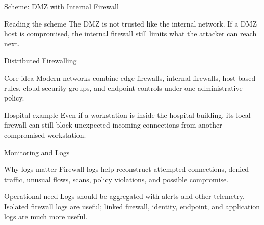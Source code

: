 \documentclass[presentation]{beamer}
\begin{document}
\begin{frame}[c]{Scheme: DMZ with Internal Firewall}
\begin{center}
\end{center}

\begin{block}{Reading the scheme}
The DMZ is not trusted like the internal network. If a DMZ host is compromised, the internal firewall
still limits what the attacker can reach next.
\end{block}
\end{frame}

\begin{frame}[c]{Distributed Firewalling}
\begin{block}{Core idea}
Modern networks combine edge firewalls, internal firewalls, host-based rules, cloud security groups,
and endpoint controls under one administrative policy.
\end{block}

\begin{exampleblock}{Hospital example}
Even if a workstation is inside the hospital building, its local firewall can still block unexpected
incoming connections from another compromised workstation.
\end{exampleblock}
\end{frame}

\begin{frame}[c]{Monitoring and Logs}
\begin{block}{Why logs matter}
Firewall logs help reconstruct attempted connections, denied traffic, unusual flows, scans, policy
violations, and possible compromise.
\end{block}

\begin{block}{Operational need}
Logs should be aggregated with alerts and other telemetry. Isolated firewall logs are useful; linked
firewall, identity, endpoint, and application logs are much more useful.
\end{block}
\end{frame}
\end{document}
